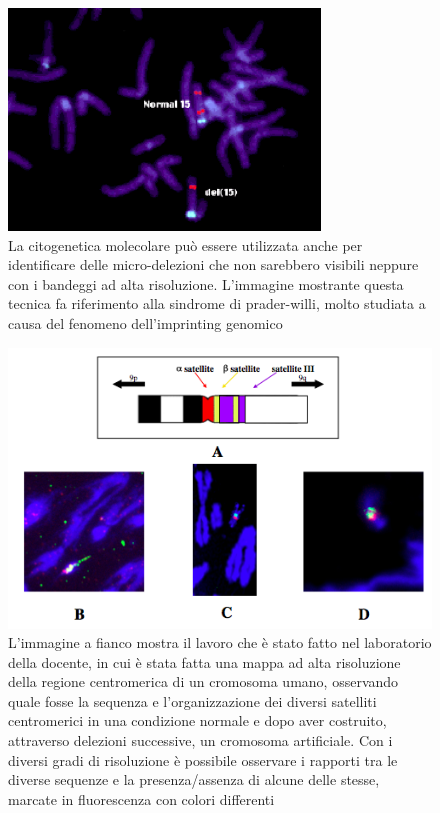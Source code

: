 \documentclass[11pt]{book}
\begin{document}
\begin{figure}[h!]
\centering
\includegraphics[scale=0.60]{img/14_microdelezioni.png}
\caption{La citogenetica molecolare può essere utilizzata anche per identificare delle micro-delezioni che non sarebbero visibili neppure con i  bandeggi ad alta risoluzione. L’immagine mostrante questa tecnica fa riferimento alla sindrome di prader-willi, molto studiata a causa del fenomeno dell’imprinting genomico}
\label{}
\end{figure}

\begin{figure}[h!]
\centering
\includegraphics[scale=0.50]{img/15_cromoartificiale.png}
\caption{L’immagine a fianco mostra il lavoro che è stato fatto nel laboratorio della docente, in cui è stata fatta una mappa ad alta risoluzione della regione centromerica di un cromosoma umano, osservando quale fosse la sequenza e l’organizzazione dei diversi satelliti centromerici in una condizione normale e dopo aver costruito, attraverso delezioni successive, un cromosoma artificiale. 
Con i diversi gradi di risoluzione è possibile osservare i rapporti tra le diverse sequenze e la presenza/assenza di alcune delle stesse, marcate in fluorescenza con colori differenti}
\label{}
\end{figure}
\end{document}
